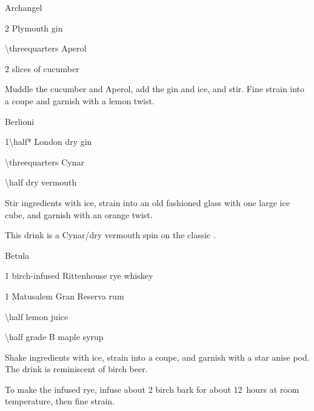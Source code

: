 \begin{Cocktail}[\PDT]{Archangel}
  \begin{Ingredients}
  \item \SI{2}{\oz} Plymouth gin
  \item \SI{\threequarters}{\oz} Aperol
  \item 2 slices of cucumber
  \end{Ingredients}
  
  \begin{Instructions}
	Muddle the cucumber and Aperol, add the gin and ice, and stir.  Fine strain into a coupe and garnish with a lemon twist.
  \end{Instructions}
\end{Cocktail}

\begin{Cocktail}[\PDT]{Berlioni}
  \begin{Ingredients}
  \item \SI{1\half*}{\oz} London dry gin
  \item \SI{\threequarters}{\oz} Cynar
  \item \SI{\half}{\oz} dry vermouth
  \end{Ingredients}
  
  \begin{Instructions}
	Stir ingredients with ice, strain into an old fashioned glass with one large ice cube, and garnish with an orange twist.
	
	This drink is a Cynar/dry vermouth spin on the classic .
  \end{Instructions}
\end{Cocktail}

\begin{Cocktail}[\PDT]{Betula}
  \begin{Ingredients}
  \item \SI{1}{\oz} birch-infused Rittenhouse rye whiskey
  \item \SI{1}{\oz} Matusalem Gran Reserva rum
  \item \SI{\half}{\oz} lemon juice
  \item \SI{\half}{\oz} grade B maple syrup
  \end{Ingredients}
  
  \begin{Instructions}
	Shake ingredients with ice, strain into a coupe, and garnish with a star anise pod.  The drink is reminiscent of birch beer.
	
	To make the infused rye, infuse about \SI{2}{\oz} birch bark for about 12~hours at room temperature, then fine strain.
  \end{Instructions}
\end{Cocktail}

